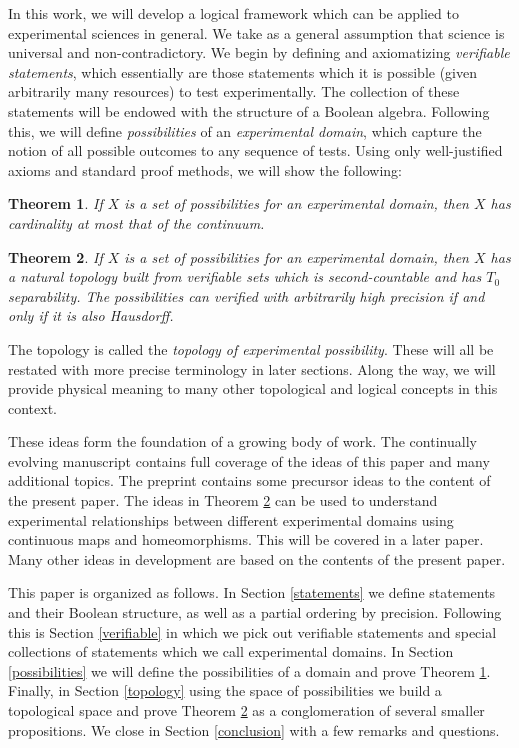 \documentclass[psamsfonts]{amsart}
\newtheorem{thm}{Theorem}[section]
\theoremstyle{definition}
\theoremstyle{remark}
\numberwithin{equation}{section}
\begin{document}
In this work, we will develop a logical framework which can be applied to experimental sciences in general. We take as a general assumption that science is universal and non-contradictory. We begin by defining and axiomatizing \emph{verifiable statements}, which essentially are those statements which it is possible (given arbitrarily many resources) to test experimentally. The collection of these statements will be endowed with the structure of a Boolean algebra. Following this, we will define \emph{possibilities} of an \emph{experimental domain}, which capture the notion of all possible outcomes to any sequence of tests. Using only well-justified axioms and standard proof methods, we will show the following: 
\begin{thm}\label{cardinality_thm}
If $X$ is a set of possibilities for an experimental domain, then $X$ has cardinality at most that of the continuum.
\end{thm}
\begin{thm}
\label{main}
If $X$ is a set of possibilities for an experimental domain, then $X$ has a natural topology built from verifiable sets which is second-countable and has $T_0$ separability. The possibilities can verified with arbitrarily high precision if and only if it is also Hausdorff. 
\end{thm}
The topology is called the \emph{topology of experimental possibility}. These will all be restated with more precise terminology in later sections. Along the way, we will provide physical meaning to many other topological and logical concepts in this context. 

These ideas form the foundation of a growing body of work. The continually evolving manuscript \cite{carc3} contains full coverage of the ideas of this paper and many additional topics. The preprint \cite{carc2} contains some precursor ideas to the content of the present paper. The ideas in Theorem \ref{main} can be used to understand experimental relationships between different experimental domains using continuous maps and homeomorphisms. This will be covered in a later paper. Many other ideas in development are based on the contents of the present paper. 

This paper is organized as follows. In Section \ref{statements} we define statements and their Boolean structure, as well as a partial ordering by precision. Following this is Section \ref{verifiable} in which we pick out verifiable statements and special collections of statements which we call experimental domains. In Section \ref{possibilities} we will define the possibilities of a domain and prove Theorem \ref{cardinality_thm}. Finally, in Section \ref{topology} using the space of possibilities we build a topological space and prove Theorem \ref{main} as a conglomeration of several smaller propositions. We close in Section \ref{conclusion} with a few remarks and questions. 
\end{document}
